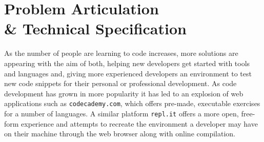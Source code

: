 \chapter{Problem Articulation\\ \& Technical Specification} \label{chapter:probart}
As the number of people are learning to code increases, more solutions  are appearing with the aim of both, helping new developers get started with tools and languages and, giving more experienced developers an environment to test new code snippets for their personal or professional development. As code development has grown in more popularity it has led to an explosion of web applications such as \texttt{codecademy.com}, which offers pre-made, executable exercises for a number of languages. A similar platform \texttt{repl.it} offers a more open, free-form experience and attempts to recreate the environment a developer may have on their machine through the web browser along with online compilation.

